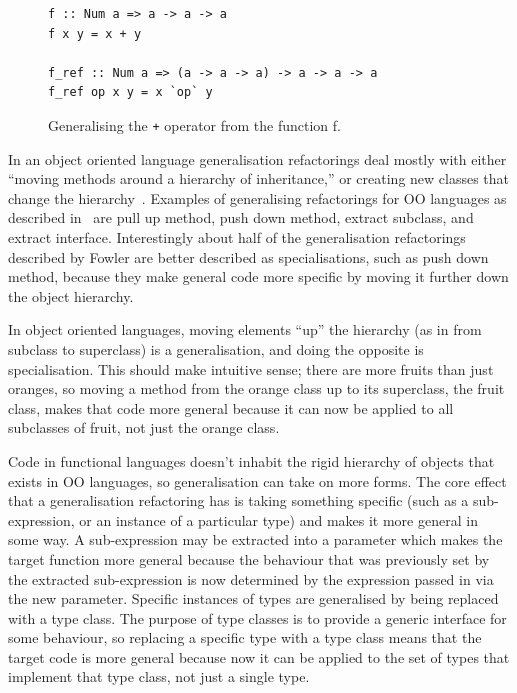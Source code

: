 \begin{figure}[t]
\begin{lstlisting}
f :: Num a => a -> a -> a
f x y = x + y

f_ref :: Num a => (a -> a -> a) -> a -> a -> a
f_ref op x y = x `op` y
\end{lstlisting}
\caption{Generalising the \texttt{+} operator from the function f.}
\label{genOp}
\end{figure} 

In an object oriented language generalisation refactorings deal mostly with either ``moving methods around a hierarchy of inheritance,'' or creating new classes that change the hierarchy~\citep{fowler}. Examples of generalising refactorings for OO languages as described in~\citep{fowler} are pull up method, push down method, extract subclass, and extract interface. Interestingly about half of the generalisation refactorings described by Fowler are better described as specialisations, such as push down method, because they make general code more specific by moving it further down the object hierarchy.

In object oriented languages, moving elements ``up'' the hierarchy (as in from subclass to superclass) is a generalisation, and doing the opposite is specialisation. This should make intuitive sense; there are more fruits than just oranges, so moving a method from the orange class up to its superclass, the fruit class, makes that code more general because it can now be applied to all subclasses of fruit, not just the orange class.

Code in functional languages doesn't inhabit the rigid hierarchy of objects that exists in OO languages, so generalisation can take on more forms. The core effect that a generalisation refactoring has is taking something specific (such as a sub-expression, or an instance of a particular type) and makes it more general in some way. A sub-expression may be extracted into a parameter which makes the target function more general because the behaviour that was previously set by the extracted sub-expression is now determined by the expression passed in via the new parameter. Specific instances of types are generalised by being replaced with a type class. The purpose of type classes is to provide a generic interface for some behaviour, so replacing a specific type with a type class means that the target code is more general because now it can be applied to the set of types that implement that type class, not just a single type.

